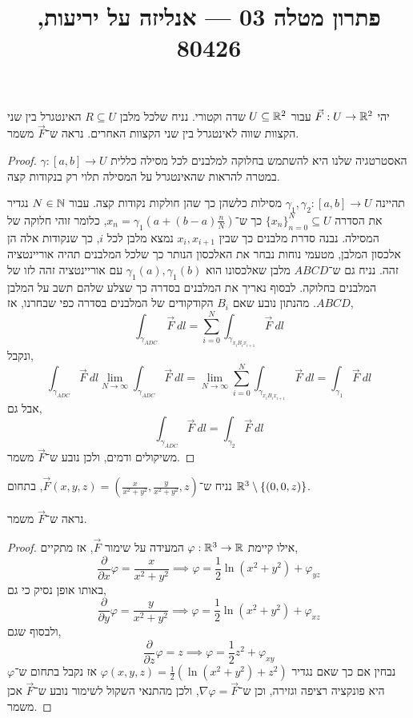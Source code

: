
\title{פתרון מטלה 03 --- אנליזה על יריעות, 80426}


\maketitle
\maketitleprint{}

\question{}
יהי $\vec{F} : U \to \mathbb{R}^2$ עבור $U \subseteq \mathbb{R}^2$ שדה וקטורי.
נניח שלכל מלבן $R \subseteq U$ האינטגרל בין שני הקצוות שווה לאינטגרל בין שני הקצוות האחרים.
נראה ש־$\vec{F}$ משמר.
\begin{proof}
	האסטרטגיה שלנו היא להשתמש בחלוקה למלבנים לכל מסילה כללית $\gamma : [a, b] \to U$ במטרה להראות שהאינטגרל על המסילה תלוי רק בנקודות קצה.

	תהיינה $\gamma_1, \gamma_2 : [a, b] \to U$ מסילות כלשהן כך שהן חולקות נקודות קצה.
	עבור $N \in \mathbb{N}$ נגדיר את הסדרה ${\{ x_n \}}_{n = 0}^N \subseteq U$ כך ש־$x_n = \gamma_1(a + (b - a)\frac{n}{N})$, כלומר זוהי חלוקה של המסילה.
	נבנה סדרת מלבנים כך שבין $x_i, x_{i + 1}$ נמצא מלבן לכל $i$, כך שנקודות אלה הן אלכסון המלבן, מטעמי נוחות נבחר את האלכסון הנותר כך שלכל המלבנים תהיה אוריינטציה זהה.
	נניח גם ש־$ABCD$ מלבן שאלכסונו הוא $\gamma_1(a), \gamma_1(b)$ עם אוריינטציה זהה לזו של המלבנים בחלוקה.
	לבסוף נאריך את המלבנים בסדרה כך שצלע שלהם תשב על המלבן $ABCD$.
	מהנתון נובע שאם $B_i$ הקודקודים של המלבנים בסדרה כפי שבחרנו, אז,
	\[
		\int_{\gamma_{ADC}} \vec{F}\ dl
		= \sum_{i = 0}^N \int_{\gamma_{x_i B_i x_{i + 1}}} \vec{F}\ dl
	\]
	ונקבל,
	\[
		\int_{\gamma_{ADC}} \vec{F}\ dl
		\lim_{N \to \infty} \int_{\gamma_{ADC}} \vec{F}\ dl
		= \lim_{N \to \infty} \sum_{i = 0}^N \int_{\gamma_{x_i B_i x_{i + 1}}} \vec{F}\ dl
		= \int_{\gamma_1} \vec{F}\ dl
	\]
	אבל גם,
	\[
		\int_{\gamma_{ADC}} \vec{F}\ dl
		= \int_{\gamma_2} \vec{F}\ dl
	\]
	משיקולים ודמים, ולכן נובע ש־$\vec{F}$ משמר.
\end{proof}

\question{}
נניח ש־$\vec{F}(x, y, z) = (\frac{x}{x^2 + y^2}, \frac{y}{x^2 + y^2}, z)$, בתחום $\mathbb{R}^3 \setminus \{ (0, 0, z) \}$.

\subquestion{}
נראה ש־$\vec{F}$ משמר.
\begin{proof}
	אילו קיימת $\varphi : \mathbb{R}^3 \to \mathbb{R}$ המעידה על שימור $\vec{F}$, אז מתקיים,
	\[
		\frac{\partial}{\partial x} \varphi = \frac{x}{x^2 + y^2}
		\implies \varphi = \frac{1}{2} \ln(x^2 + y^2) + \varphi_{yz}
	\]
	באותו אופן נסיק כי גם,
	\[
		\frac{\partial}{\partial y} \varphi = \frac{y}{x^2 + y^2}
		\implies \varphi = \frac{1}{2} \ln(x^2 + y^2) + \varphi_{xz}
	\]
	ולבסוף שגם,
	\[
		\frac{\partial}{\partial z} \varphi = z
		\implies \varphi = \frac{1}{2} z^2 + \varphi_{xy}
	\]
	נבחין אם כך שאם נגדיר $\varphi(x, y, z) = \frac{1}{2}(\ln(x^2 + y^2) + z^2)$
	אז נקבל בתחום ש־$\varphi$ היא פונקציה רציפה וגזירה, וכן ש־$\nabla \varphi = \vec{F}$, ולכן מהתנאי השקול לשימור נובע ש־$\vec{F}$ אכן משמר.
\end{proof}

